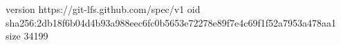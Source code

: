 version https://git-lfs.github.com/spec/v1
oid sha256:2db18f6b04d4b93a988eec6fc0b5653e72278e89f7e4c69f1f52a7953a478aa1
size 34199
